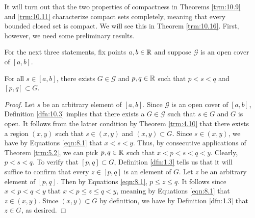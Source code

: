 \documentclass[../main.tex]{subfiles}
\begin{document}
It will turn out that the two properties of compactness in Theorems \ref{trm:10.9} and \ref{trm:10.11} characterize compact sets completely, meaning that every bounded closed set is compact. We will see this in Theorem \ref{trm:10.16}. First, however, we need some preliminary results.\par
For the next three statements, fix points $a,b\in\mathbb{R}$ and suppose $\mathcal{G}$ is an open cover of $[a,b]$.

\begin{lemma}\label{lem:10.12}
    For all $s\in[a,b]$, there exists $G\in\mathcal{G}$ and $p,q\in\mathbb{R}$ such that $p<s<q$ and $[p,q]\subset G$.
    \begin{proof}
        Let $s$ be an arbitrary element of $[a,b]$. Since $\mathcal{G}$ is an open cover of $[a,b]$, Definition \ref{dfn:10.3} implies that there exists a $G\in\mathcal{G}$ such that $s\in G$ and $G$ is open. It follows from the latter condition by Theorem \ref{trm:4.10} that there exists a region $(x,y)$ such that $s\in(x,y)$ and $(x,y)\subset G$. Since $s\in(x,y)$, we have by Equations \ref{eqn:8.1} that $x<s<y$. Thus, by consecutive applications of Theorem \ref{trm:5.2}, we can pick $p,q\in\mathbb{R}$ such that $x<p<s<q<y$. Clearly, $p<s<q$. To verify that $[p,q]\subset G$, Definition \ref{dfn:1.3} tells us that it will suffice to confirm that every $z\in[p,q]$ is an element of $G$. Let $z$ be an arbitrary element of $[p,q]$. Then by Equations \ref{eqn:8.1}, $p\leq z\leq q$. It follows since $x<p<q<y$ that $x<p\leq z\leq q<y$, meaning by Equations \ref{eqn:8.1} that $z\in(x,y)$. Since $(x,y)\subset G$ by definition, we have by Definition \ref{dfn:1.3} that $z\in G$, as desired.
    \end{proof}
\end{lemma}
\end{document}
